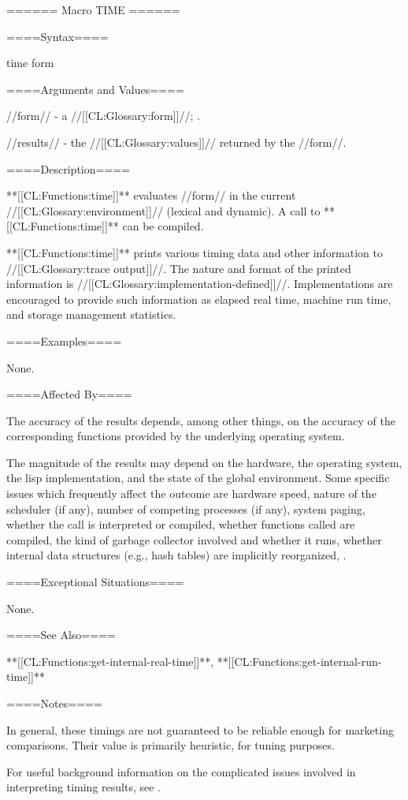 ====== Macro TIME ======

====Syntax====

\DefmacWithValues time {form} {}

====Arguments and Values====

//form// - a //[[CL:Glossary:form]]//; \evalspecial.

//results// - the //[[CL:Glossary:values]]// returned by the //form//.

====Description====

**[[CL:Functions:time]]** evaluates //form// in the current //[[CL:Glossary:environment]]// (lexical and dynamic). A call to **[[CL:Functions:time]]** can be compiled.

**[[CL:Functions:time]]** prints various timing data and other information to //[[CL:Glossary:trace output]]//. The nature and format of the printed information is //[[CL:Glossary:implementation-defined]]//. Implementations are encouraged to provide such information as elapsed real time, machine run time, and storage management statistics.

====Examples====

None.

====Affected By====

The accuracy of the results depends, among other things, on the accuracy of the corresponding functions provided by the underlying operating system.

The magnitude of the results may depend on the hardware, the operating system, the lisp implementation, and the state of the global environment. Some specific issues which frequently affect the outcome are hardware speed, nature of the scheduler (if any), number of competing processes (if any), system paging, whether the call is interpreted or compiled, whether functions called are compiled, the kind of garbage collector involved and whether it runs, whether internal data structures (e.g., hash tables) are implicitly reorganized, \etc.

====Exceptional Situations====

None.

====See Also====

**[[CL:Functions:get-internal-real-time]]**, **[[CL:Functions:get-internal-run-time]]**

====Notes====

In general, these timings are not guaranteed to be reliable enough for marketing comparisons. Their value is primarily heuristic, for tuning purposes.

For useful background information on the complicated issues involved in interpreting timing results, see {\GabrielBenchmarks}.

